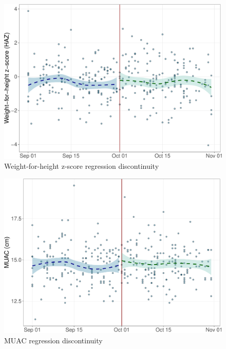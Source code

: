 \documentclass[12pt,a4paper]{article}
\begin{document}
\begin{figure}[H]

{\centering \includegraphics{kayahReport_files/figure-latex/rd4-1} 

}

\caption{Weight-for-height z-score regression discontinuity}\label{fig:rd4}
\end{figure}

\begin{figure}[H]

{\centering \includegraphics{kayahReport_files/figure-latex/rd5-1} 

}

\caption{MUAC regression discontinuity}\label{fig:rd5}
\end{figure}

\newpage
\end{document}
